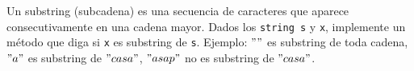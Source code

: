 Un substring (subcadena) es una secuencia de caracteres que aparece consecutivamente en una cadena mayor. Dados los \texttt{string s} y \texttt{x}, implemente un método que diga si \texttt{x} es substring de \texttt{s}. Ejemplo: \texttt{$""$} es substring de toda cadena, \texttt{$"a"$} es substring de \texttt{$"casa"$}, \texttt{$"asap"$} no es substring de \texttt{$"casa"$}.